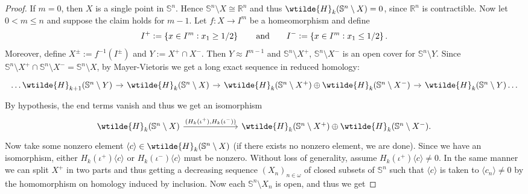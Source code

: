 \begin{proof}
	If $m = 0$, then $X$ is a single point in $\mathbb{S}^n$. Hence $\mathbb{S}^n \setminus X \cong \mathbb{R}^n$ and thus $\wtilde{H}_k(\mathbb{S}^n \setminus X) = 0$, since $\mathbb{R}^n$ is contractible. Now let $0 < m \leq n$ and suppose the claim holds for $m - 1$. Let $f : X \to I^m$ be a homeomorphism and define 
	\begin{equation*}
		I^+ := \cbr[0]{x \in I^m : x_1 \geq 1/2} \qquad \text{and} \qquad I^- := \cbr[0]{x \in I^m : x_1 \leq 1/2}.
	\end{equation*}
	Moreover, define $X^{\pm} := f^{-1}(I^{\pm})$ and $Y := X^+ \cap X^-$. Then $Y \approx I^{m - 1}$ and $\mathbb{S}^n \setminus X^+$, $\mathbb{S}^n \setminus X^-$ is an open cover for $\mathbb{S}^n \setminus Y$. Since $\mathbb{S}^n \setminus X^+ \cap \mathbb{S}^n \setminus X^- = \mathbb{S}^n \setminus X$, by Mayer-Vietoris we get a long exact sequence in reduced homology:
	\begin{equation*}
		\begin{tikzcd}[column sep=2ex]
			\dots\wtilde{H}_{k + 1}(\mathbb{S}^n \setminus Y) \arrow[r] & \wtilde{H}_k(\mathbb{S}^n\setminus X) \arrow[r] & \wtilde{H}_k(\mathbb{S}^n \setminus X^+) \oplus \wtilde{H}_k(\mathbb{S}^n \setminus X^-) \arrow[r] & \wtilde{H}_k(\mathbb{S}^n \setminus Y)\dots
		\end{tikzcd}
	\end{equation*}
	By hypothesis, the end terms vanish and thus we get an isomorphism
	\begin{equation*}
		\begin{tikzcd}[column sep=15ex]
			\wtilde{H}_k(\mathbb{S}^n\setminus X) \arrow[r,"{(H_k(\iota^+),H_k(\iota^-))}"] & \wtilde{H}_k(\mathbb{S}^n \setminus X^+) \oplus \wtilde{H}_k(\mathbb{S}^n \setminus X^-).
		\end{tikzcd}
	\end{equation*}
	Now take some nonzero element $\langle c \rangle \in \wtilde{H}_k(\mathbb{S}^n \setminus X)$ (if there exists no nonzero element, we are done). Since we have an isomorphism, either $H_k(\iota^+)\langle c \rangle$ or $H_k(\iota^-)\langle c \rangle$ must be nonzero. Without loss of generality, assume $H_k(\iota^+)\langle c \rangle \neq 0$. In the same manner we can split $X^+$ in two parts and thus getting a decreasing sequence $(X_n)_{n \in \omega}$ of closed subsets of $\mathbb{S}^n$ such that $\langle c \rangle$ is taken to $\langle c_n \rangle \neq 0$ by the homomorphism on homology induced by inclusion. Now each $\mathbb{S}^n \setminus X_n$ is open, and thus we get

\end{proof}

